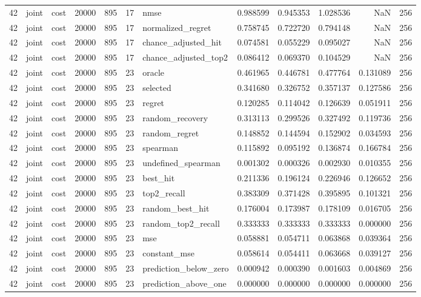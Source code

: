 \begin{tabular}{rllrrrlrrrrr}
42 & joint & cost & 20000 & 895 & 17 & nmse & 0.988599 & 0.945353 & 1.028536 & NaN & 256 \\
42 & joint & cost & 20000 & 895 & 17 & normalized_regret & 0.758745 & 0.722720 & 0.794148 & NaN & 256 \\
42 & joint & cost & 20000 & 895 & 17 & chance_adjusted_hit & 0.074581 & 0.055229 & 0.095027 & NaN & 256 \\
42 & joint & cost & 20000 & 895 & 17 & chance_adjusted_top2 & 0.086412 & 0.069370 & 0.104529 & NaN & 256 \\
42 & joint & cost & 20000 & 895 & 23 & oracle & 0.461965 & 0.446781 & 0.477764 & 0.131089 & 256 \\
42 & joint & cost & 20000 & 895 & 23 & selected & 0.341680 & 0.326752 & 0.357137 & 0.127586 & 256 \\
42 & joint & cost & 20000 & 895 & 23 & regret & 0.120285 & 0.114042 & 0.126639 & 0.051911 & 256 \\
42 & joint & cost & 20000 & 895 & 23 & random_recovery & 0.313113 & 0.299526 & 0.327492 & 0.119736 & 256 \\
42 & joint & cost & 20000 & 895 & 23 & random_regret & 0.148852 & 0.144594 & 0.152902 & 0.034593 & 256 \\
42 & joint & cost & 20000 & 895 & 23 & spearman & 0.115892 & 0.095192 & 0.136874 & 0.166784 & 256 \\
42 & joint & cost & 20000 & 895 & 23 & undefined_spearman & 0.001302 & 0.000326 & 0.002930 & 0.010355 & 256 \\
42 & joint & cost & 20000 & 895 & 23 & best_hit & 0.211336 & 0.196124 & 0.226946 & 0.126652 & 256 \\
42 & joint & cost & 20000 & 895 & 23 & top2_recall & 0.383309 & 0.371428 & 0.395895 & 0.101321 & 256 \\
42 & joint & cost & 20000 & 895 & 23 & random_best_hit & 0.176004 & 0.173987 & 0.178109 & 0.016705 & 256 \\
42 & joint & cost & 20000 & 895 & 23 & random_top2_recall & 0.333333 & 0.333333 & 0.333333 & 0.000000 & 256 \\
42 & joint & cost & 20000 & 895 & 23 & mse & 0.058881 & 0.054711 & 0.063868 & 0.039364 & 256 \\
42 & joint & cost & 20000 & 895 & 23 & constant_mse & 0.058614 & 0.054411 & 0.063668 & 0.039127 & 256 \\
42 & joint & cost & 20000 & 895 & 23 & prediction_below_zero & 0.000942 & 0.000390 & 0.001603 & 0.004869 & 256 \\
42 & joint & cost & 20000 & 895 & 23 & prediction_above_one & 0.000000 & 0.000000 & 0.000000 & 0.000000 & 256 \\

\end{tabular}
